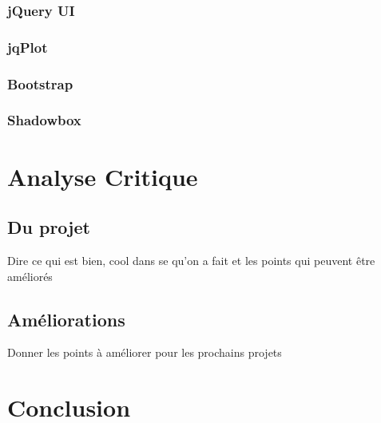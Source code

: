 \documentclass[twoside]{EPURapport}
\begin{document}
		\subsection{jQuery UI}
	
		\subsection{jqPlot}
		
		\subsection{Bootstrap}
		
		\subsection{Shadowbox}

\chapter{Analyse Critique}

	\section{Du projet}
	
	Dire ce qui est bien, cool dans se qu'on a fait et les points qui peuvent être améliorés
	
	\section{Améliorations}
	
	Donner les points à améliorer pour les prochains projets

\chapter{Conclusion}

\annexes
\end{document}
